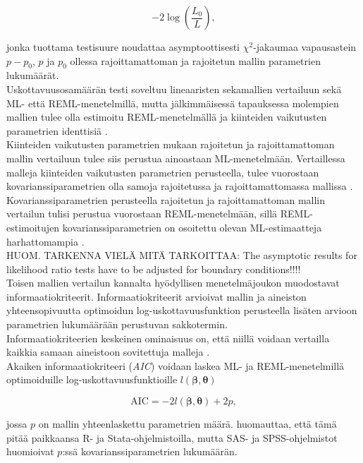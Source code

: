 \documentclass[finnish]{docopts}
\begin{document}
$$
-2 \log(\frac{L_0}{L}),
$$

jonka tuottama testisuure noudattaa asymptoottisesti $\chi^2$-jakaumaa vapausastein $p-p_0$, $p$ ja $p_0$ ollessa rajoittamattoman ja rajoitetun mallin parametrien lukumäärät.\\

 Uskottavuusosamäärän testi soveltuu lineaaristen sekamallien vertailuun sekä ML- että REML-menetelmillä, mutta jälkimmäisessä tapauksessa molempien mallien tulee olla estimoitu REML-menetelmällä ja kiinteiden vaikutusten parametrien identtisiä \cite{pinheiro00}.\\
 
 Kiinteiden vaikutusten parametrien mukaan rajoitetun ja rajoittamattoman mallin vertailuun tulee siis perustua ainoastaan ML-menetelmään. Vertaillessa malleja kiinteiden vaikutusten parametrien perusteella, tulee vuorostaan kovarianssiparametrien olla samoja rajoitetussa ja rajoittamattomassa mallissa \cite{west14}.\\
 
 Kovarianssiparametrien perusteella rajoitetun ja rajoittamattoman mallin vertailun tulisi perustua vuorostaan REML-menetelmään, sillä REML-estimoitujen kovarianssiparametrien on osoitettu olevan ML-estimaatteja harhattomampia \cite{west14}.\\
 
 \cite{pinheiro00} HUOM. TARKENNA VIELÄ MITÄ TARKOITTAA: The asymptotic results for likelihood ratio tests have to be adjusted for boundary conditions!!!! \\
 
 Toisen mallien vertailun kannalta hyödyllisen menetelmäjoukon muodostavat informaatiokriteerit. Informaatiokriteerit arvioivat mallin ja aineiston yhteensopivuutta optimoidun log-uskottavuusfunktion perusteella lisäten arvioon parametrien lukumäärään perustuvan sakkotermin.\\
 
 Informaatiokriteerien keskeinen ominaisuus on, että niillä voidaan vertailla kaikkia samaan aineistoon sovitettuja malleja \cite{west14}.\\
 
 Akaiken informaatiokriteeri (\textit{AIC}) voidaan laskea ML- ja REML-menetelmillä optimoiduille log-uskottavuusfunktioille \cite{west14} $l(\bm{\beta}, \bm{\theta})$
 
 $$
 \text{AIC} = -2l(\bm{\beta}, \bm{\theta})+2p,
 $$
 
 jossa $p$ on mallin yhteenlaskettu parametrien määrä. \cite{west14} huomauttaa, että tämä pitää paikkaansa R- ja Stata-ohjelmistoilla, mutta SAS- ja SPSS-ohjelmistot huomioivat $p$:ssä kovarianssiparametrien lukumäärän.
 
\end{document}
